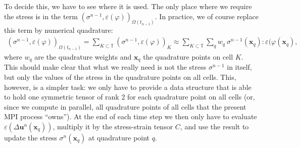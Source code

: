 \documentclass{article}
\renewcommand{\vec}[1]{\mathbf{#1}}
\begin{document}
To decide this, we have to see where it is used. The only place where we
require the stress is in the term
$(\sigma^{n-1},\varepsilon(\varphi))_{\Omega(t_{n-1})}$. In practice, we of
course replace this term by numerical quadrature:
\begin{gather}
  (\sigma^{n-1},\varepsilon(\varphi))_{\Omega(t_{n-1})}
  =
  \sum_{K\subset {\mathbb{T}}}
  (\sigma^{n-1},\varepsilon(\varphi))_K
  \approx
  \sum_{K\subset {\mathbb{T}}}
  \sum_q
  w_q \ \sigma^{n-1}(\vec x_q) : \varepsilon(\varphi(\vec x_q),
\end{gather}
where $w_q$ are the quadrature weights and $\vec x_q$ the quadrature points on
cell $K$. This should make clear that what we really need is not the stress
$\sigma^{n-1}$ in itself, but only the values of the stress in the quadrature
points on all cells. This, however, is a simpler task: we only have to provide
a data structure that is able to hold one symmetric tensor of rank 2 for each
quadrature point on all cells (or, since we compute in parallel, all
quadrature points of all cells that the present MPI process ``owns''). At the
end of each time step we then only have to evaluate $\varepsilon(\Delta \vec
u^n(\vec x_q))$, multiply it by the stress-strain tensor $C$, and use the
result to update the stress $\sigma^n(\vec x_q)$ at quadrature point $q$.
\end{document}
